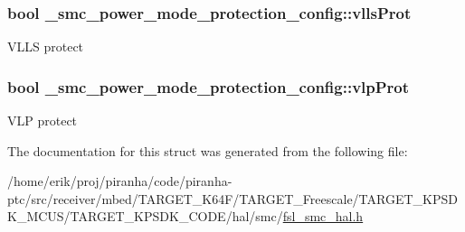 \subsubsection[{\texorpdfstring{vlls\+Prot}{vllsProt}}]{\setlength{\rightskip}{0pt plus 5cm}bool \+\_\+smc\+\_\+power\+\_\+mode\+\_\+protection\+\_\+config\+::vlls\+Prot}\hypertarget{struct__smc__power__mode__protection__config_ae79a6aa027e6f5a2177bed8c5d208fd7}{}\label{struct__smc__power__mode__protection__config_ae79a6aa027e6f5a2177bed8c5d208fd7}
V\+L\+LS protect 
\subsubsection[{\texorpdfstring{vlp\+Prot}{vlpProt}}]{\setlength{\rightskip}{0pt plus 5cm}bool \+\_\+smc\+\_\+power\+\_\+mode\+\_\+protection\+\_\+config\+::vlp\+Prot}\hypertarget{struct__smc__power__mode__protection__config_a2a3db9c5cd8ba9ad935300c64feb68a9}{}\label{struct__smc__power__mode__protection__config_a2a3db9c5cd8ba9ad935300c64feb68a9}
V\+LP protect 

The documentation for this struct was generated from the following file\+:\begin{DoxyCompactItemize}
\item 
/home/erik/proj/piranha/code/piranha-\/ptc/src/receiver/mbed/\+T\+A\+R\+G\+E\+T\+\_\+\+K64\+F/\+T\+A\+R\+G\+E\+T\+\_\+\+Freescale/\+T\+A\+R\+G\+E\+T\+\_\+\+K\+P\+S\+D\+K\+\_\+\+M\+C\+U\+S/\+T\+A\+R\+G\+E\+T\+\_\+\+K\+P\+S\+D\+K\+\_\+\+C\+O\+D\+E/hal/smc/\hyperlink{fsl__smc__hal_8h}{fsl\+\_\+smc\+\_\+hal.\+h}\end{DoxyCompactItemize}
